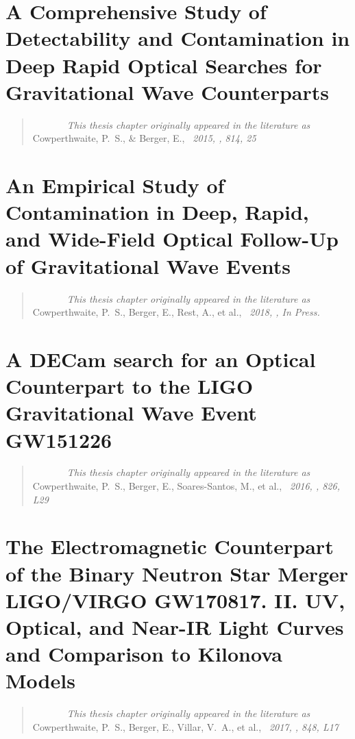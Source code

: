 \documentclass[plain]{hvdthesis}
\begin{document}
\chapter{A Comprehensive Study of Detectability and Contamination in Deep Rapid Optical Searches for Gravitational Wave Counterparts}\label{c:occ}
\begin{quote}
{\em ~~~~~~~This thesis chapter originally appeared in the literature as} \\
{Cowperthwaite, P.~S., \& Berger, E.,
{\em \ 2015, \apj, 814, 25}}
\end{quote}

\clearpage
%
\chapter{An Empirical Study of Contamination in Deep, Rapid, and Wide-Field Optical Follow-Up of Gravitational Wave Events}\label{c:occ2}
\begin{quote}
{\em ~~~~~~~This thesis chapter originally appeared in the literature as} \\
{Cowperthwaite, P.~S., Berger, E., Rest, A., et al.,
{\em \ 2018, \apj, In Press.}}
\end{quote}

\clearpage
%
\chapter{A DECam search for an Optical Counterpart to the LIGO Gravitational Wave Event GW151226}\label{c:occ}
\begin{quote}
{\em ~~~~~~~This thesis chapter originally appeared in the literature as} \\
{Cowperthwaite, P.~S., Berger, E., Soares-Santos, M., et al.,
{\em\ 2016, \apjl, 826, L29}}
\end{quote}

\clearpage
%
\chapter{The Electromagnetic Counterpart of the Binary Neutron Star Merger LIGO/VIRGO GW170817. II. UV, Optical, and Near-IR Light Curves and Comparison to Kilonova Models}\label{c:occ}
\begin{quote}
{\em ~~~~~~~This thesis chapter originally appeared in the literature as} \\
{Cowperthwaite, P.~S., Berger, E., Villar, V.~A., et al.,
{\em \ 2017, \apjl, 848, L17}}
\end{quote}



\singlespace


\end{document}
